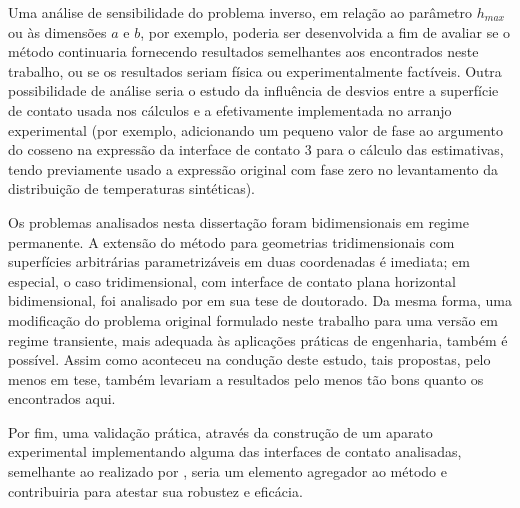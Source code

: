 Uma análise de sensibilidade do problema inverso, em relação ao parâmetro $h_{max}$ ou às dimensões $a$ e $b$, por exemplo, poderia ser desenvolvida a fim de avaliar se o método continuaria fornecendo resultados semelhantes aos encontrados neste trabalho, ou se os resultados seriam física ou experimentalmente factíveis. Outra possibilidade de análise seria o estudo da influência de desvios entre a superfície de contato usada nos cálculos e a efetivamente implementada no arranjo experimental (por exemplo, adicionando um pequeno valor de fase ao argumento do cosseno na expressão da interface de contato 3 para o cálculo das estimativas, tendo previamente usado a expressão original com fase zero no levantamento da distribuição de temperaturas sintéticas).

Os problemas analisados nesta dissertação foram bidimensionais em regime permanente. A extensão do método para geometrias tridimensionais com superfícies arbitrárias parametrizáveis em duas coordenadas é imediata; em especial, o caso tridimensional, com interface de contato plana horizontal bidimensional, foi analisado por \cite{tese_camila} em sua tese de doutorado. Da mesma forma, uma modificação do problema original formulado neste trabalho para uma versão em regime transiente, mais adequada às aplicações práticas de engenharia, também é possível. Assim como aconteceu na condução deste estudo, tais propostas, pelo menos em tese, também levariam a resultados pelo menos tão bons quanto os encontrados aqui.

Por fim, uma validação prática, através da construção de um aparato experimental implementando alguma das interfaces de contato analisadas, semelhante ao realizado por \cite{tese_abreu}, seria um elemento agregador ao método e contribuiria para atestar sua robustez e eficácia.